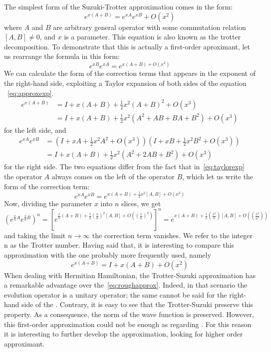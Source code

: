 The simplest form of the Suzuki-Trotter approximation comes in the form:
\begin{equation} \label{eq:approxexp}
e^{x(A+B)} = e^{xA}e^{xB} + O(x^2) 
\end{equation}
where $A$ and $B$ are arbitrary general operator with some commutation relation $[A,B] \neq 0$, and $x$ is a parameter. This equation is also known as the trotter decomposition. To demonstrate that this is actually a first-order aproximant, let us rearrange the formula in this form:
\begin{equation}
e^{xB}e^{xA} = e^{x(A+B) + O(x^2)}
\end{equation}
We can calculate the form of the correction terms that appears in the exponent of the right-hand side, exploiting a Taylor expansion of both sides of the equation ~\eqref{eq:approxexp}.
\begin{align}
e^{x(A+B)} &= I + x(A+B) + \frac{1}{2} x^2 (A+B)^2 + O(x^3) \\
& = I + x(A+B) + \frac{1}{2} x^2 (A^2 + AB + BA + B^2) + O(x^3) 
\end{align}
for the left side, and
\begin{align} \label{eq:taylorexp}
e^{xA}e^{xB} &= (I + xA + \frac{1}{2} x^2 A^2 + O(x^3)) (I + xB + \frac{1}{2} x^2 B^2 + O(x^3))\\
& = I + x(A+B) + \frac{1}{2} x^2 (A^2 + 2AB + B^2) + O(x^3) 
\end{align}
for the right side. The two equations differ from the fact that in~\eqref{eq:taylorexp} the operator $A$ always comes on the left of the operator $B$, which let us write the form of the correction term:
\begin{equation}
e^{xA} e^{xB} = e^{x(A+B) + \frac{1}{2} x^2 [A,B] + O(x^3)}
\end{equation}
Now, dividing the parameter $x$ into $n$ slices, we get
\begin{equation}
\left(e^{\frac{x}{n}A} e^{\frac{x}{n}B} \right)^n = \left[ e^{\frac{x}{n}(A + B) + \frac{1}{2}(\frac{x}{n})^2 [A,B] + O((\frac{x}{n})^3)} \right]^n = e^{x(A+B) + \frac{1}{2}(\frac{x^2}{n}) [A,B] + O((\frac{x^3}{n^2}))} 
\end{equation}
and taking the limit $n \rightarrow \infty$ the correction term vanishes. We refer to the integer n as the Trotter number.
Having said that, it is interesting to compare this approximation with the one probably more frequently used, namely
\begin{equation} \label{eq:roughapprox}
e^{x(A+B)} = I + x(A+B) + O(x^2)
\end{equation}
When dealing with Hermitian Hamiltonian, the Trotter-Suzuki approximation has a remarkable advantage over the~\eqref{eq:roughapprox}. Indeed, in that scenario the evolution operator is a unitary operator; the same cannot be said for the right-hand side of the \label{eq:roughapprox}. Contrary, it is easy to see that the Trotter-Suzuki preserve this property. As a consequence, the norm of the wave function is preserved. However, this first-order approximation could not be enough as regarding . For this reason it is interesting to further develop the approximation, looking for higher order approximant.

